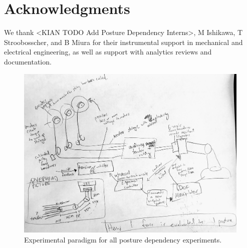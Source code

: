 \documentclass[utf8]{frontiersSCNS} %
\begin{document}
\section*{Acknowledgments}
We thank <KIAN TODO Add Posture Dependency Interns>, M Ishikawa, T Stroobosscher, and B Miura for their instrumental support in mechanical and electrical engineering, as well as support with analytics reviews and documentation.



\begin{figure}[h!]
\begin{center}
\includegraphics[width=17.5cm]{figures/overview/overview.jpg}%
\end{center}
\caption{Experimental paradigm for all posture dependency experiments.}
\label{fig:overview}
\end{figure}
\end{document}

